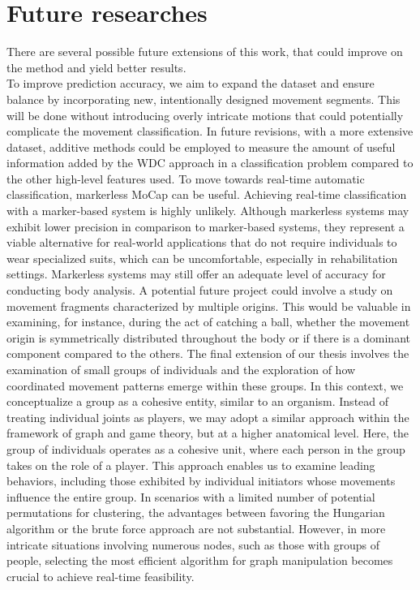 \section{Future researches}
\label{sec:future_researches}
There are several possible future extensions of this work, that could improve on the method and yield better results. \\
To improve prediction accuracy, we aim to expand the dataset and ensure balance by incorporating new, intentionally designed movement segments.
This will be done without introducing overly intricate motions that could potentially complicate the movement classification.
In future revisions, with a more extensive dataset, additive methods could be employed to measure the amount of useful information added by the WDC approach in a classification problem compared to the other high-level features used.
To move towards real-time automatic classification, markerless MoCap can be useful.
Achieving real-time classification with a marker-based system is highly unlikely.
Although markerless systems may exhibit lower precision in comparison to marker-based systems, 
they represent a viable alternative for real-world applications that do not require individuals to wear specialized suits, which can be uncomfortable, especially in rehabilitation settings. 
Markerless systems may still offer an adequate level of accuracy for conducting body analysis.
A potential future project could involve a study on movement fragments characterized by multiple origins.
This would be valuable in examining, for instance, during the act of catching a ball, whether the movement origin is symmetrically distributed throughout the body or if there is a dominant component compared to the others.
The final extension of our thesis involves the examination of small groups of individuals and the exploration of how coordinated movement patterns emerge within these groups.
In this context, we conceptualize a group as a cohesive entity, similar to an organism.
Instead of treating individual joints as players, we may adopt a similar approach within the framework of graph and game theory, but at a higher anatomical level.
Here, the group of individuals operates as a cohesive unit, where each person in the group takes on the role of a player. 
This approach enables us to examine leading behaviors, including those exhibited by individual initiators whose movements influence the entire group.
In scenarios with a limited number of potential permutations for clustering, the advantages between favoring the Hungarian algorithm or the brute force approach are not substantial. 
However, in more intricate situations involving numerous nodes, such as those with groups of people, selecting the most efficient algorithm for graph manipulation becomes crucial to achieve real-time feasibility.
